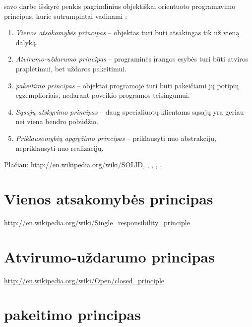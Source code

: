 
 savo darbe \cite{martin2000design}
išskyrė penkis pagrindinius objektiškai orientuoto programavimo
principus, kurie sutrumpintai vadinami :
\begin{enumerate}
  \item \emph{Vienos atsakomybės principas}  – objektas turi būti atsakingas tik už vieną
    dalyką.
  \item \emph{Atvirumo-uždarumo principas} 
    – programinės įrangos esybės turi būti atviros praplėtimui, bet
    uždaros pakeitimui.
  \item \emph{ pakeitimo principas}  – objektai programoje turi būti pakeičiami
    jų potipių egzemplioriais, nedarant poveikio programos teisingumui.
  \item \emph{Sąsajų atskyrimo principas}  – daug specialiuotų klientams sąsajų yra geriau
    nei viena bendro pobūdžio.
  \item \emph{Priklausomybių apgręžimo principas}  – priklausyti nuo abstrakcijų, nepriklausyti
    nuo realizacijų.
\end{enumerate}

Plačiau: \url{http://en.wikipedia.org/wiki/SOLID},
\cite{martin2000design}, \cite{Grosberg1997design},
\cite{martin1995designing}, \cite{martin2003agile}.

\section{Vienos atsakomybės principas}

\url{http://en.wikipedia.org/wiki/Single_responsibility_principle}

\section{Atvirumo-uždarumo principas}

\url{http://en.wikipedia.org/wiki/Open/closed_principle}

\section{ pakeitimo principas}

